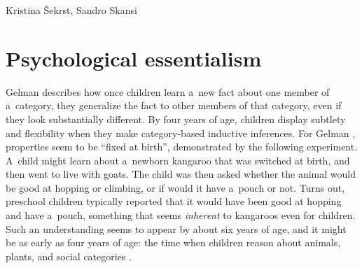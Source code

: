\begin{artengenv2auth}{Kristina Šekrst, Sandro Skansi}
\section{Psychological essentialism}
Gelman
\parencite*[][p.405]{gelman_psychological_2004} %
 describes how once children learn a~new fact about one member of a~category, they generalize the fact to other members of that category, even if they look substantially different. By four years of age, children display subtlety and flexibility when they make category-based inductive inferences. For Gelman 
\parencite*[][p.405]{gelman_psychological_2004}, %
 properties seem to be ``fixed at birth'', demonstrated by the following experiment. A~child might learn about a~newborn kangaroo that was switched at birth, and then went to live with goats. The child was then asked whether the animal would be good at hopping or climbing, or if would it have a~pouch or not. Turns out, preschool children typically reported that it would have been good at hopping and have a~pouch, something that seems \textit{inherent} to kangaroos even for children. Such an understanding seems to appear by about six years of age, and it might be as early as four years of age: the time when children reason about animals, plants, and social categories 
\parencite[][p.406]{gelman_psychological_2004}.%



\end{artengenv2auth}
